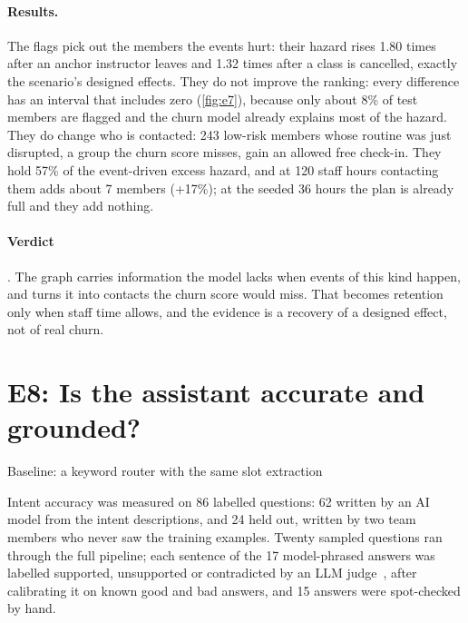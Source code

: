 \paragraph{Results.} The flags pick out the members the events hurt: their hazard rises 1.80 times after an anchor instructor leaves and 1.32 times after a class is cancelled, exactly the scenario's designed effects. They do not improve the ranking: every difference has an interval that includes zero (\cref{fig:e7}), because only about 8\% of test members are flagged and the churn model already explains most of the hazard. They do change who is contacted: 243 low-risk members whose routine was just disrupted, a group the churn score misses, gain an allowed free check-in. They hold 57\% of the event-driven excess hazard, and at 120 staff hours contacting them adds about 7 members (+17\%); at the seeded 36 hours the plan is already full and they add nothing.

\paragraph{Verdict} . The graph carries information the model lacks when events of this kind happen, and turns it into contacts the churn score would miss. That becomes retention only when staff time allows, and the evidence is a recovery of a designed effect, not of real churn.

\section{E8: Is the assistant accurate and grounded?}
\label{sec:e8}
\quad\textsf{\small Baseline: a keyword router with the same slot extraction}

Intent accuracy was measured on 86 labelled questions: 62 written by an AI model from the intent descriptions, and 24 held out, written by two team members who never saw the training examples. Twenty sampled questions ran through the full pipeline; each sentence of the 17 model-phrased answers was labelled supported, unsupported or contradicted by an LLM judge~\cite{zheng2023judge}, after calibrating it on known good and bad answers, and 15 answers were spot-checked by hand.

